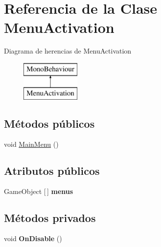 \hypertarget{class_menu_activation}{}\section{Referencia de la Clase Menu\+Activation}
\label{class_menu_activation}
Diagrama de herencias de Menu\+Activation\begin{figure}[H]
\begin{center}
\leavevmode
\includegraphics[height=2.000000cm]{class_menu_activation}
\end{center}
\end{figure}
\subsection*{Métodos públicos}
\begin{DoxyCompactItemize}
\item 
void \mbox{\hyperlink{class_menu_activation_a33c2996911d4edd216846a868c94ab72}{Main\+Menu}} ()
\end{DoxyCompactItemize}
\subsection*{Atributos públicos}
\begin{DoxyCompactItemize}
\item 
\mbox{\label{class_menu_activation_a2fafee3893d91c1f926282e7d92b3b92}} 
Game\+Object \mbox{[}$\,$\mbox{]} {\bfseries menus}
\end{DoxyCompactItemize}
\subsection*{Métodos privados}
\begin{DoxyCompactItemize}
\item 
\mbox{\label{class_menu_activation_a0f0894f5eb8c76a8a0129ae1e822d451}} 
void {\bfseries On\+Disable} ()
\end{DoxyCompactItemize}


